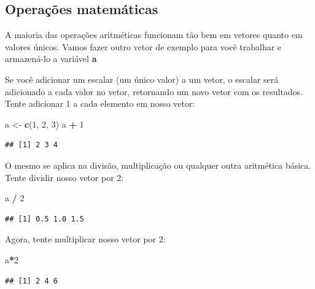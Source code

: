 \documentclass[]{book}
\newenvironment{Shaded}{\begin{snugshade}}{\end{snugshade}}
\newcommand{\DecValTok}[1]{\textcolor[rgb]{0.00,0.00,0.81}{#1}}
\newcommand{\KeywordTok}[1]{\textcolor[rgb]{0.13,0.29,0.53}{\textbf{#1}}}
\newcommand{\NormalTok}[1]{#1}
\newcommand{\OperatorTok}[1]{\textcolor[rgb]{0.81,0.36,0.00}{\textbf{#1}}}
\newcommand{\StringTok}[1]{\textcolor[rgb]{0.31,0.60,0.02}{#1}}
\begin{document}
\hypertarget{operacoes-matematicas}{%
\subsection{Operações matemáticas}\label{operacoes-matematicas}}

A maioria das operações aritméticas funcionam tão bem em vetores quanto em valores únicos. Vamos fazer outro vetor de exemplo para você trabalhar e armazená-lo a variável \textbf{a}

Se você adicionar um escalar (um único valor) a um vetor, o escalar será adicionado a cada valor no vetor, retornando um novo vetor com os resultados. Tente adicionar 1 a cada elemento em nosso vetor:

\begin{Shaded}
\begin{Highlighting}[]
\NormalTok{a <-}\StringTok{ }\KeywordTok{c}\NormalTok{(}\DecValTok{1}\NormalTok{, }\DecValTok{2}\NormalTok{, }\DecValTok{3}\NormalTok{)}
\NormalTok{a }\OperatorTok{+}\StringTok{ }\DecValTok{1}
\end{Highlighting}
\end{Shaded}

\begin{verbatim}
## [1] 2 3 4
\end{verbatim}

O mesmo se aplica na divisão, multiplicação ou qualquer outra aritmética básica. Tente dividir nosso vetor por 2:

\begin{Shaded}
\begin{Highlighting}[]
\NormalTok{a }\OperatorTok{/}\StringTok{ }\DecValTok{2}
\end{Highlighting}
\end{Shaded}

\begin{verbatim}
## [1] 0.5 1.0 1.5
\end{verbatim}

Agora, tente multiplicar nosso vetor por 2:

\begin{Shaded}
\begin{Highlighting}[]
\NormalTok{a}\OperatorTok{*}\DecValTok{2}
\end{Highlighting}
\end{Shaded}

\begin{verbatim}
## [1] 2 4 6
\end{verbatim}
\end{document}
